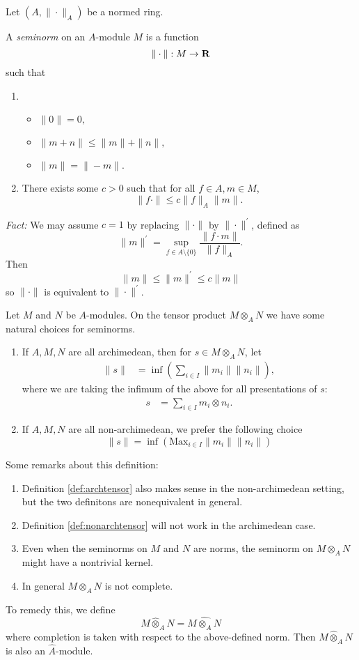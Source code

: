 Let $(A,\|\cdot\|_A)$ be a normed ring.
\begin{definition}\label{def:modules}
A \emph{seminorm} on an  $A$-module $M$ is a function
\[
  \|\cdot\|:M\to\mathbf{R}
\]
such that
\begin{enumerate}
\item
\begin{itemize}
\item $\|0\|=0,$
\item $\|m+n\|\leqslant \|m\|+\|n\|,$
\item $\|m\|=\|-m\|.$
\end{itemize}
\item There exists some $c>0$ such that for all $f\in A,m\in M$,
\[
\|f\cdot\|\leqslant c\|f\|_A\|m\|.
\]
\end{enumerate}
\end{definition}
\emph{Fact:} We may assume $c=1$ by replacing $\|\cdot\|$ by $\|\cdot\|^\prime$, defined as
\[
\|m\|^\prime=\sup_{f\in A\setminus\{0\}}\frac{\|f\cdot m\|}{\|f\|_A}.
\]
Then
\[
\|m\|\leqslant \|m\|^\prime\leqslant c\|m\|
\]
so $\|\cdot\|$ is equivalent to $\|\cdot\|^\prime$.

Let $M$ and $N$ be $A$-modules. On the tensor product $M\otimes_A N$ we have some natural choices for seminorms.
\begin{enumerate}
\item If $A,M,N$ are all archimedean, then for $s\in M\otimes_A N$, let
\begin{align}
\|s\|&=\inf \left( \sum_{i\in I}\|m_i\|\|n_i\| \right),\label{def:archtensor}
\end{align}
where we are taking the infimum of the above for all presentations of $s$:
\begin{align}
s&=\sum_{i\in I} m_i\otimes n_i.\label{def:nonarchtensor}
\end{align}
\item If $A,M,N$ are all non-archimedean, we prefer the following choice
\[
\|s\|=\inf \left( \text{Max}_{i\in I} \|m_i\|\|n_i\| \right)
\]
\end{enumerate}
Some remarks about this definition:
\begin{enumerate}
\item Definition \eqref{def:archtensor} also makes sense in the non-archimedean setting, but the two definitons are nonequivalent in general.
\item Definition \eqref{def:nonarchtensor} will not work in the archimedean case.
\item Even when the seminorms on $M$ and $N$ are norms, the seminorm on $M\otimes_A N$ might have a nontrivial kernel.
\item In general $M\otimes_A N$ is not complete.
\end{enumerate}
To remedy this, we define
\[
  M\hat{\otimes}_AN=\widehat{M\otimes_A N}
\]
where completion is taken with respect to the above-defined norm. Then $M\hat{\otimes}_AN$ is also an $\hat{A}$-module.

